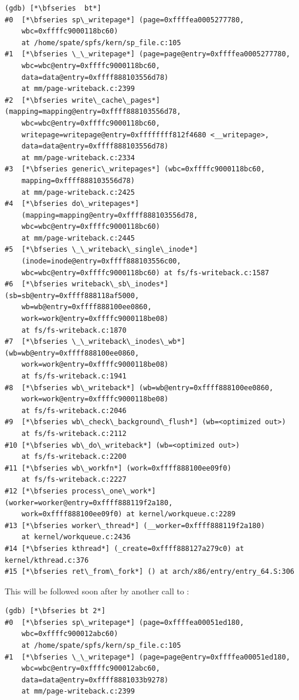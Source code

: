 \begin{lstlisting}
(gdb) [*\bfseries  bt*]
#0  [*\bfseries sp\_writepage*] (page=0xffffea0005277780, 
    wbc=0xffffc9000118bc60) 
    at /home/spate/spfs/kern/sp_file.c:105
#1  [*\bfseries \_\_writepage*] (page=page@entry=0xffffea0005277780, 
    wbc=wbc@entry=0xffffc9000118bc60, 
    data=data@entry=0xffff888103556d78) 
    at mm/page-writeback.c:2399
#2  [*\bfseries write\_cache\_pages*] (mapping=mapping@entry=0xffff888103556d78, 
    wbc=wbc@entry=0xffffc9000118bc60, 
    writepage=writepage@entry=0xffffffff812f4680 <__writepage>, 
    data=data@entry=0xffff888103556d78) 
    at mm/page-writeback.c:2334
#3  [*\bfseries generic\_writepages*] (wbc=0xffffc9000118bc60, 
    mapping=0xffff888103556d78)  
    at mm/page-writeback.c:2425
#4  [*\bfseries do\_writepages*] 
    (mapping=mapping@entry=0xffff888103556d78, 
    wbc=wbc@entry=0xffffc9000118bc60) 
    at mm/page-writeback.c:2445
#5  [*\bfseries \_\_writeback\_single\_inode*] 
    (inode=inode@entry=0xffff888103556c00, 
    wbc=wbc@entry=0xffffc9000118bc60) at fs/fs-writeback.c:1587
#6  [*\bfseries writeback\_sb\_inodes*] (sb=sb@entry=0xffff888118af5000, 
    wb=wb@entry=0xffff888100ee0860, 
    work=work@entry=0xffffc9000118be08) 
    at fs/fs-writeback.c:1870
#7  [*\bfseries \_\_writeback\_inodes\_wb*] (wb=wb@entry=0xffff888100ee0860, 
    work=work@entry=0xffffc9000118be08) 
    at fs/fs-writeback.c:1941
#8  [*\bfseries wb\_writeback*] (wb=wb@entry=0xffff888100ee0860, 
    work=work@entry=0xffffc9000118be08) 
    at fs/fs-writeback.c:2046
#9  [*\bfseries wb\_check\_background\_flush*] (wb=<optimized out>) 
    at fs/fs-writeback.c:2112
#10 [*\bfseries wb\_do\_writeback*] (wb=<optimized out>) 
    at fs/fs-writeback.c:2200
#11 [*\bfseries wb\_workfn*] (work=0xffff888100ee09f0) 
    at fs/fs-writeback.c:2227
#12 [*\bfseries process\_one\_work*] (worker=worker@entry=0xffff888119f2a180, 
    work=0xffff888100ee09f0) at kernel/workqueue.c:2289
#13 [*\bfseries worker\_thread*] (__worker=0xffff888119f2a180) 
    at kernel/workqueue.c:2436
#14 [*\bfseries kthread*] (_create=0xffff888127a279c0) at kernel/kthread.c:376
#15 [*\bfseries ret\_from\_fork*] () at arch/x86/entry/entry_64.S:306
\end{lstlisting}

\noindent
This will be followed soon after by another call to :

\begin{lstlisting}
(gdb) [*\bfseries bt 2*]
#0  [*\bfseries sp\_writepage*] (page=0xffffea00051ed180, 
    wbc=0xffffc900012abc60) 
    at /home/spate/spfs/kern/sp_file.c:105
#1  [*\bfseries \_\_writepage*] (page=page@entry=0xffffea00051ed180, 
    wbc=wbc@entry=0xffffc900012abc60, 
    data=data@entry=0xffff8881033b9278) 
    at mm/page-writeback.c:2399
\end{lstlisting}

